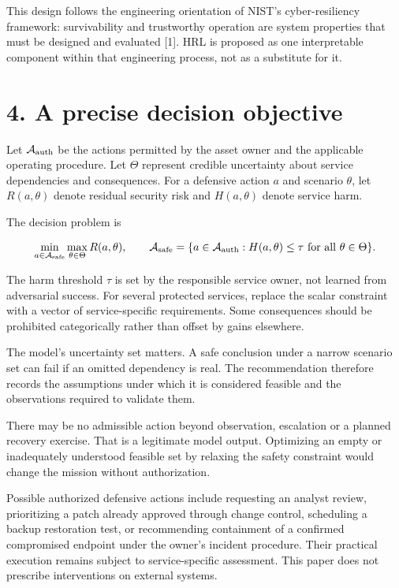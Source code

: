 \documentclass[11pt]{article}
\begin{document}
This design follows the engineering orientation of NIST's cyber-resiliency framework: survivability and trustworthy operation are system properties that must be designed and evaluated [1]. HRL is proposed as one interpretable component within that engineering process, not as a substitute for it.

\clearpage
\section*{4. A precise decision objective}
Let $\mathcal A_{\rm auth}$ be the actions permitted by the asset owner and the applicable operating procedure. Let $\Theta$ represent credible uncertainty about service dependencies and consequences. For a defensive action $a$ and scenario $\theta$, let $R(a,\theta)$ denote residual security risk and $H(a,\theta)$ denote service harm.

The decision problem is

\[
\min_{a\in\mathcal A_{\rm safe}}\max_{\theta\in\Theta}R(a,\theta),
\qquad
\mathcal A_{\rm safe}=\{a\in\mathcal A_{\rm auth}:H(a,\theta)\le\tau\text{ for all }\theta\in\Theta\}.
\]

The harm threshold $\tau$ is set by the responsible service owner, not learned from adversarial success. For several protected services, replace the scalar constraint with a vector of service-specific requirements. Some consequences should be prohibited categorically rather than offset by gains elsewhere.

The model's uncertainty set matters. A safe conclusion under a narrow scenario set can fail if an omitted dependency is real. The recommendation therefore records the assumptions under which it is considered feasible and the observations required to validate them.

There may be no admissible action beyond observation, escalation or a planned recovery exercise. That is a legitimate model output. Optimizing an empty or inadequately understood feasible set by relaxing the safety constraint would change the mission without authorization.

Possible authorized defensive actions include requesting an analyst review, prioritizing a patch already approved through change control, scheduling a backup restoration test, or recommending containment of a confirmed compromised endpoint under the owner's incident procedure. Their practical execution remains subject to service-specific assessment. This paper does not prescribe interventions on external systems.
\end{document}
